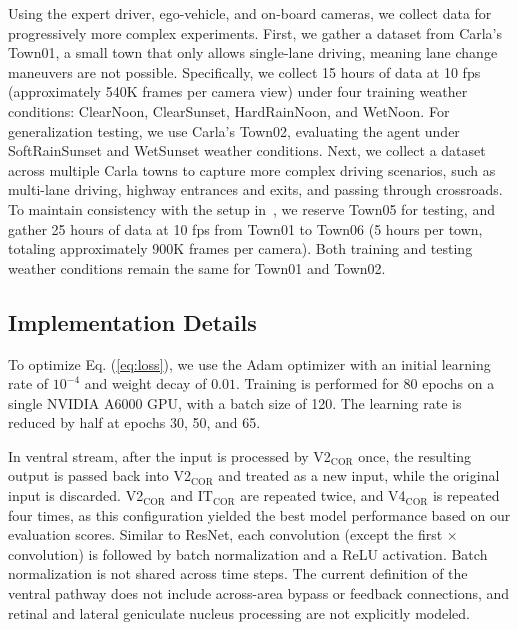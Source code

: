 Using the expert driver, ego-vehicle, and on-board cameras, we collect data for progressively more complex experiments.
First, we gather a dataset from Carla's Town01, a small town that only allows single-lane driving, meaning lane change maneuvers are not possible.  
Specifically, we collect 15 hours of data at 10 fps (approximately 540K frames per camera view) under four training weather conditions: ClearNoon, ClearSunset, HardRainNoon, and WetNoon. 
For generalization testing, we use Carla's Town02, evaluating the agent under SoftRainSunset and WetSunset weather conditions. 
Next, we collect a dataset across multiple Carla towns to capture more complex driving scenarios, such as multi-lane driving, highway entrances and exits, and passing through crossroads. 
To maintain consistency with the setup in~\cite{Hu:2022}, we reserve Town05 for testing, and gather 25 hours of data at 10 fps from Town01 to Town06 (5 hours per town, totaling approximately 900K frames per camera). 
Both training and testing weather conditions remain the same for Town01 and Town02.



\subsection{Implementation Details}

\hspace{1pc}To optimize Eq. (\ref{eq:loss}), we use the Adam optimizer \cite{Kingma:2015} with an initial learning rate of $10^{-4}$ and weight decay of $0.01$. 
Training is performed for 80 epochs on a single NVIDIA A6000 GPU, with a batch size of 120.
The learning rate is reduced by half at epochs 30, 50, and 65.


In ventral stream, after the input is processed by V2$_\text{COR}$ once, the resulting output is passed back into V2$_\text{COR}$ and treated as a new input, while the original input is discarded.
V2$_\text{COR}$ and IT$_\text{COR}$ are repeated twice, and V4$_\text{COR}$ is repeated four times, as this configuration yielded the best model performance based on our evaluation scores.
Similar to ResNet, each convolution (except the first $ \times $ convolution) is followed by batch normalization and a ReLU activation.
Batch normalization is not shared across time steps.
The current definition of the ventral pathway does not include across-area bypass or feedback connections, and retinal and lateral geniculate nucleus processing are not explicitly modeled.


